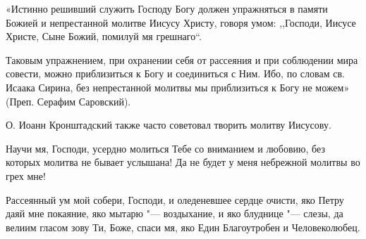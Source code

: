 «Истинно решивший служить Господу Богу должен упражняться в памяти Божией и непрестанной молитве Иисусу Христу, говоря умом: ,,Господи, Иисусе Христе, Сыне Божий, помилуй мя грешнаго``. 

Таковым упражнением, при охранении себя от рассеяния и при соблюдении мира совести, можно приблизиться к Богу и соединиться с Ним. Ибо, по словам св. Исаака Сирина, без непрестанной молитвы мы приблизиться к Богу не можем» (Преп. Серафим Саровский). 

О. Иоанн Кронштадский также часто советовал творить молитву Иисусову.


\mychapterending

 





Научи мя, Господи, усердно молиться Тебе со вниманием и любовию, без которых молитва не бывает услышана! Да не будет у меня небрежной молитвы во грех мне!

 


\mychapterending

 





Рассеянный ум мой собери, Господи, и оледеневшее сердце очисти, яко Петру даяй мне покаяние, яко мытарю "--- воздыхание, и яко блуднице "--- слезы, да велиим гласом зову Ти, Боже, спаси мя, яко Един Благоутробен и Человеколюбец. 




\mychapterending

 






